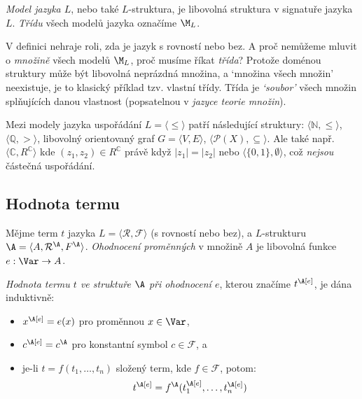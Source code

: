 \begin{definition}
\emph{Model jazyka $L$}, nebo také $L$-struktura, je libovolná struktura v signatuře jazyka $L$. \emph{Třídu} všech modelů jazyka označíme $\M_L$.
\end{definition}

\begin{remark}
V definici nehraje roli, zda je jazyk s rovností nebo bez. A proč nemůžeme mluvit o \emph{množině} všech modelů $\M_L$, proč musíme říkat \emph{třída}? Protože doménou struktury může být libovolná neprázdná množina, a `množina všech množin' neexistuje, je to klasický příklad tzv. vlastní třídy. Třída je \emph{`soubor'} všech množin splňujících danou vlastnost (popsatelnou v \emph{jazyce teorie množin}).
\end{remark}


\begin{example}
    Mezi modely jazyka uspořádání $L=\langle \leq \rangle$ patří následující struktury: $\langle \mathbb N,\leq\rangle$, $\langle \mathbb Q, > \rangle$, libovolný orientovaný graf $G=\langle V,E\rangle$, $\langle \mathcal P(X),\subseteq\rangle$. Ale také např. $\langle \mathbb C,R^\mathbb C\rangle$ kde $(z_1,z_2)\in R^\mathbb C$ právě když $|z_1|=|z_2|$ nebo $\langle \{0,1\},\emptyset\rangle$, což \emph{nejsou} částečná uspořádání.
\end{example}


\subsection{Hodnota termu}

Mějme term $t$ jazyka $L=\langle \mathcal R,\mathcal F\rangle$ (s rovností nebo bez), a $L$-strukturu $\A=\langle A,\mathcal R^\A,F^\A\rangle$. \emph{Ohodnocení proměnných} v množině $A$ je libovolná funkce $e:\Var\to A$.

\begin{definition}
    \emph{Hodnota termu $t$ ve struktuře $\A$ při ohodnocení $e$}, kterou značíme $t^\A[e]$, je dána induktivně:
    \begin{itemize}
        \item $x^\A[e]=e(x)$ pro proměnnou $x\in\Var$,
        \item $c^\A[e]=c^\A$ pro konstantní symbol $c\in\mathcal F$, a
        \item je-li $t=f(t_1,\dots,t_n)$ složený term, kde $f\in\mathcal F$, potom:
        $$
        t^\A[e]=f^\A(t_1^\A[e],\dots,t_n^\A[e])
        $$
    \end{itemize}
\end{definition}

